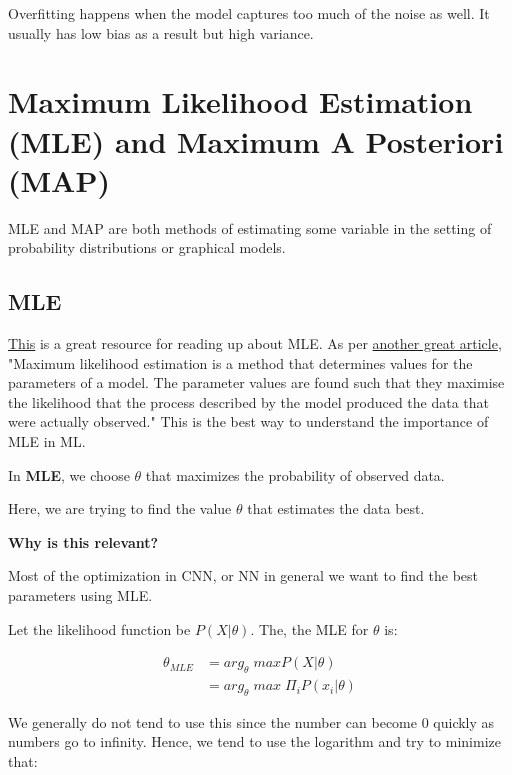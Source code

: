 Overfitting happens when the model captures too much of the noise as well. It usually has low bias as a result but high variance.

\section{Maximum Likelihood Estimation (MLE) and Maximum A Posteriori (MAP)}

MLE and MAP are both methods of estimating some variable in the setting of probability distributions or graphical models.

\subsection{MLE}

\href{https://www.probabilitycourse.com/chapter8/8_2_3_max_likelihood_estimation.php}{This} is a great resource for reading up about MLE. As per \href{https://towardsdatascience.com/probability-concepts-explained-maximum-likelihood-estimation-c7b4342fdbb1}{another great article}, "Maximum likelihood estimation is a method that determines values for the parameters of a model. The parameter values are found such that they maximise the likelihood that the process described by the model produced the data that were actually observed." This is the best way to understand the importance of MLE in ML.

In \textbf{MLE}, we choose $\theta$ that maximizes the probability of observed data.

Here, we are trying to find the value $\theta$ that estimates the data best.

\textbf{Why is this relevant?}

Most of the optimization in CNN, or NN in general we want to find the best parameters using MLE.

Let the likelihood function be $P(X|\theta)$. The, the MLE for $\theta$ is:

\begin{equation}
\begin{split}
    \theta_{MLE} &= arg_{\theta} \; maxP(X|\theta) \\
    &= arg_{\theta} \; max \; \Pi_{i} P(x_i | \theta)
\end{split}
\end{equation}

We generally do not tend to use this since the number can become 0 quickly as numbers go to infinity. Hence, we tend to use the logarithm and try to minimize that:

